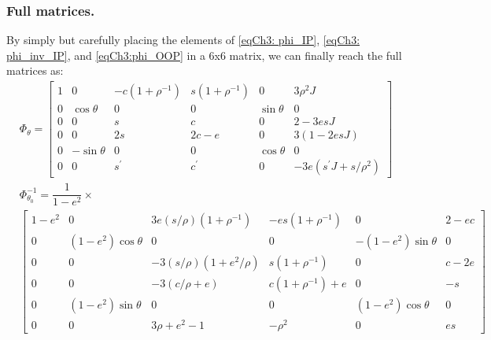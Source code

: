 		\subsubsection{Full matrices.}
		\indent By simply but carefully placing the elements of \eqref{eqCh3: phi_IP}, \eqref{eqCh3: phi_inv_IP}, and \eqref{eqCh3:phi_OOP} in a 6x6 matrix, we can finally reach the full matrices as:
		\begin{subequations}
		\begin{alignat}{2}
		&\label{eqCh3:phi_final} \Phi_{\theta} = 
		\left[
		\begin{array}{cccccc}
		1 	&    0 			&  -c  (1 + \rho^{-1})	& s  (1 + \rho^{-1})	&    0			&                  3 \rho^2 J \\
        0	&  \cos\theta 	&                   0	&                 0	&  \sin\theta 	&                              0\\
        0 	&  	0			&                  s	&                 c	&    0			&              2 - 3  e  s  J\\
        0	&    0			&              2  s		&         2  c - e	&    0			&       3  (1  - 2 e  s  J)\\
        0	& -\sin\theta   &                0 		&                 0&  \cos\theta 	&                              0\\
        0	&	0 			&             s^{\prime}	&            c^{\prime}&    0			& -3  e  (s^{\prime}  J + s/\rho^2)
		\end{array}
		\right] \\
		&\nonumber \Phi_{\theta_0}^{-1} = \dfrac{1}{1 - e^2}\times \\ 
		&\label{eqCh3:phi_inv_final}\left[
		\begin{array}{cccccc}
		1 - e^2	&    0 					&  3 e  (s/\rho)  (1 + \rho^{-1})		& -e s  (1 + \rho^{-1})	&    0						&                 2 - e c\\
        0		&  (1 - e^2) \cos\theta	&         0							&                 0		&  -(1 - e^2) \sin\theta 	&              0\\
        0 		&  	0					&     -3  (s/\rho)  (1 + e^2/\rho)	&   s  (1 + \rho^{-1})	&    0						&              c - 2e	\\
        0		&    0					&          -3  (c/\rho + e)			&  c  (1 + \rho^{-1}) + e	&    0						&      -s 		\\
        0		& (1 - e^2) \sin\theta 	&                0 					&                 0		&  (1 - e^2) \cos\theta 	&                              0\\
        0		&	0 					&             3  \rho + e^2 - 1		&           -\rho^2 	&    0						& e s
		\end{array}
		\right]
		\end{alignat}
		\end{subequations}
